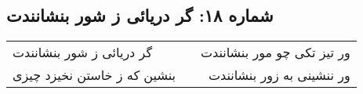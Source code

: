 \begin{center}
\section*{شماره ۱۸: گر دریائی ز شور بنشانندت}
\label{sec:018}
\begin{longtable}{l p{0.5cm} r}
گر دریائی ز شور بنشانندت
&&
ور تیز تکی چو مور بنشانندت
\\
بنشین که ز خاستن نخیزد چیزی
&&
ور ننشینی به زور بنشانندت
\\
\end{longtable}
\end{center}
